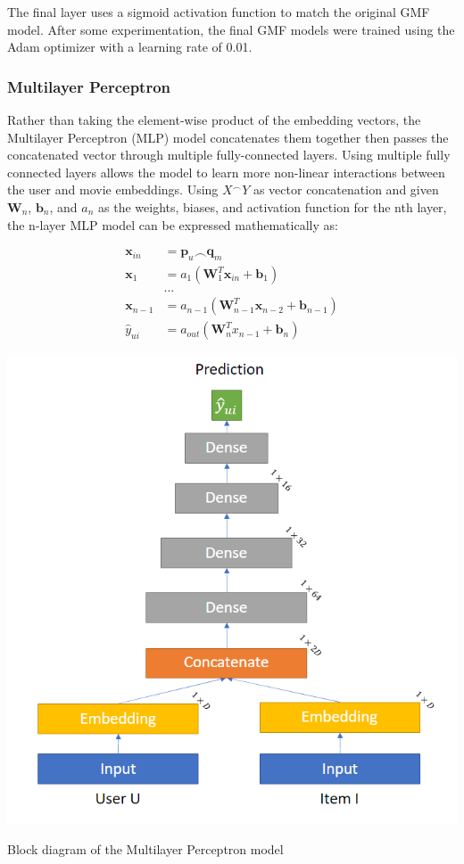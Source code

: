 \documentclass{article}
\begin{document}
The final layer uses a sigmoid activation function to match the original GMF model. After some experimentation, the final GMF models were trained using the Adam optimizer with a learning rate of 0.01. 

\subsubsection{Multilayer Perceptron}
Rather than taking the element-wise product of the embedding vectors, the Multilayer Perceptron (MLP) model concatenates them together then passes the concatenated vector through multiple fully-connected layers. Using multiple fully connected layers allows the model to learn more non-linear interactions between the user and movie embeddings. Using $X^\frown Y$ as vector concatenation and given $\mathbf{W}_n$, $\mathbf{b}_n$, and $a_{n}$ as the weights, biases, and activation function for the nth layer, the n-layer MLP model can be expressed mathematically as:

\begin{align*}
\mathbf{x}_{in} &= \mathbf{p}_u\frown \mathbf{q}_m \\
\mathbf{x}_{1} &= a_{1}(\mathbf{W}^T_{1}\mathbf{x}_{in} + \mathbf{b}_{1})\\
&...\\
\mathbf{x}_{n-1} &= a_{n-1}(\mathbf{W}^T_{n-1}\mathbf{x}_{n-2} + \mathbf{b}_{n-1})\\
\hat{y}_{ui} &= a_{out}(\mathbf{W}^T_{n}x_{n-1} + \mathbf{b}_{n})
\end{align*}

\begin{center}
\includegraphics[scale=0.4]{MLP_Diagram}

Block diagram of the Multilayer Perceptron model
\end{center}
\end{document}
